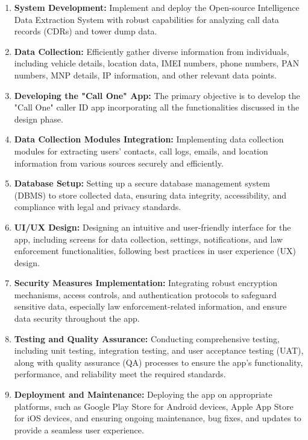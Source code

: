 \begin{enumerate}
    \item \textbf{System Development:} Implement and deploy the Open-source Intelligence Data Extraction System with robust capabilities for analyzing call data records (CDRs) and tower dump data.
    
    \item \textbf{Data Collection:} Efficiently gather diverse information from individuals, including vehicle details, location data, IMEI numbers, phone numbers, PAN numbers, MNP details, IP information, and other relevant data points.
  
    \item \textbf{Developing the "Call One" App:} The primary objective is to develop the "Call One" caller ID app incorporating all the functionalities discussed in the design phase.
    
    \item \textbf{Data Collection Modules Integration:} Implementing data collection modules for extracting users' contacts, call logs, emails, and location information from various sources securely and efficiently.
    
    \item \textbf{Database Setup:} Setting up a secure database management system (DBMS) to store collected data, ensuring data integrity, accessibility, and compliance with legal and privacy standards.
    
    \item \textbf{UI/UX Design:} Designing an intuitive and user-friendly interface for the app, including screens for data collection, settings, notifications, and law enforcement functionalities, following best practices in user experience (UX) design.
    
    \item \textbf{Security Measures Implementation:} Integrating robust encryption mechanisms, access controls, and authentication protocols to safeguard sensitive data, especially law enforcement-related information, and ensure data security throughout the app.
    
    \item \textbf{Testing and Quality Assurance:} Conducting comprehensive testing, including unit testing, integration testing, and user acceptance testing (UAT), along with quality assurance (QA) processes to ensure the app's functionality, performance, and reliability meet the required standards.
    
    \item \textbf{Deployment and Maintenance:} Deploying the app on appropriate platforms, such as Google Play Store for Android devices, Apple App Store for iOS devices, and ensuring ongoing maintenance, bug fixes, and updates to provide a seamless user experience.
    

\end{enumerate}
